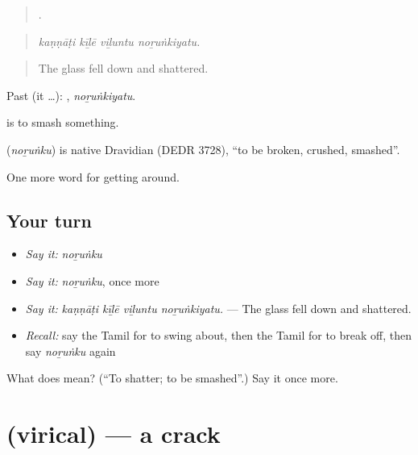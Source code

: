 \begin{quote}
   .
\end{quote}

\begin{quote}
\emph{kaṇṇāṭi kīḻē viḻuntu noṟuṅkiyatu.}
\end{quote}

\begin{quote}
The glass fell down and shattered.
\end{quote}

Past (it …): , \emph{noṟuṅkiyatu}.

 is to smash something.

\begin{cousinweb}
\textbf{} (\emph{noṟuṅku}) is native Dravidian (DEDR 3728), \textquotedblleft{}to be broken, crushed, smashed\textquotedblright{}.
\end{cousinweb}

\begin{grammarlens}[title={What you've built}]
One more word for getting around.
\end{grammarlens}

\subsection*{Your turn}
\begin{itemize}
\raggedright
  \item \emph{Say it:} \emph{noṟuṅku}
  \item \emph{Say it:} \emph{noṟuṅku}, once more
  \item \emph{Say it:} \emph{kaṇṇāṭi kīḻē viḻuntu noṟuṅkiyatu.} — The glass fell down and shattered.
  \item \emph{Recall:} say the Tamil for to swing about, then the Tamil for to break off, then say \emph{noṟuṅku} again
\end{itemize}

\begin{tcolorbox}[breakable,colback=teal!4,colframe=teal!35!black,title={Before you move on}]
What does  mean? (\textquotedblleft{}To shatter; to be smashed\textquotedblright{}.) Say it once more.
\end{tcolorbox}
\section[\texorpdfstring{\ta{விரிசல்} (virical)}{விரிசல் (virical)}]{ (virical) — a crack}

